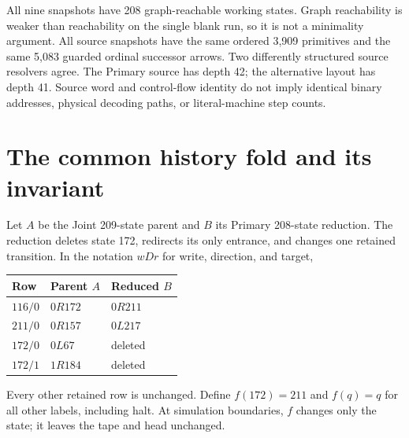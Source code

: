 \documentclass[11pt,letterpaper]{article}
\begin{document}
All nine snapshots have 208 graph-reachable working states. Graph reachability
is weaker than reachability on the single blank run, so it is not a minimality
argument. All source snapshots have the same ordered 3,909 primitives and the
same 5,083 guarded ordinal successor arrows. Two differently structured source
resolvers agree. The Primary source has depth 42; the alternative layout has
depth 41. Source word and control-flow identity do not imply identical binary
addresses, physical decoding paths, or literal-machine step counts.

\clearpage
\section{The common history fold and its invariant}
Let $A$ be the Joint 209-state parent and $B$ its Primary 208-state reduction.
The reduction deletes state 172, redirects its only entrance, and changes one
retained transition. In the notation $wDr$ for write, direction, and target,
\begin{center}\begin{tabular}{lll}\toprule
Row & Parent $A$ & Reduced $B$\\\midrule
$116/0$ & $0R172$ & $0R211$\\
$211/0$ & $0R157$ & $0L217$\\
$172/0$ & $0L67$ & deleted\\
$172/1$ & $1R184$ & deleted\\\bottomrule
\end{tabular}\end{center}
Every other retained row is unchanged. Define $f(172)=211$ and $f(q)=q$ for
all other labels, including halt. At simulation boundaries, $f$ changes only
the state; it leaves the tape and head unchanged.
\end{document}
